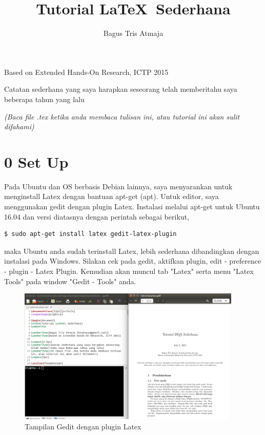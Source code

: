 \documentclass[12pt]{article}
\begin{document}
\title{Tutorial \LaTeX\ Sederhana}
\author{Bagus Tris Atmaja}

\maketitle

\centerline{Based on Extended Hands-On Research, ICTP 2015}

\vspace{2.5pc}
\centerline{Catatan sederhana yang saya harapkan seseorang telah memberitahu saya beberapa tahun yang lalu}
\centerline{\it (Baca file .tex ketika anda membaca tulisan ini, atau tutorial ini akan sulit difahami)}
\vspace{2pc}

\section*{0 Set Up}
Pada Ubuntu dan OS berbasis Debian lainnya, saya menyarankan untuk menginstall Latex dengan bantuan apt-get (apt). Untuk editor, saya menggunakan gedit dengan plugin Latex. Instalasi melalui apt-get untuk Ubuntu 16.04 dan versi diatasnya dengan perintah sebagai berikut,
\begin{lstlisting}
$ sudo apt-get install latex gedit-latex-plugin
\end{lstlisting}
maka Ubuntu anda sudah terinstall Latex, lebih sederhana dibandingkan dengan instalasi pada Windows. Silakan cek pada gedit, aktifkan plugin, edit - preference - plugin - Latex Plugin. Kemudian akan muncul tab "Latex" serta menu "Latex Tools" pada window "Gedit - Tools" anda.

\begin{figure}
\begin{center}
\includegraphics[width=4.2in]{pict/gedit-latex.png}
\end{center}
\caption{Tampilan Gedit dengan plugin Latex}
\end{figure}
\end{document}
